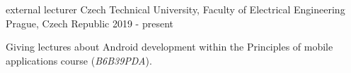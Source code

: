 \begin{cventries}
    \cventry
    {external lecturer}
    {Czech Technical University, Faculty of Electrical Engineering}
    {Prague, Czech Republic}
    {2019 - present}
    {
      \begin{cvitems}
        \item {Giving lectures about Android development within the Principles of mobile applications course (\emph{B6B39PDA}).}
      \end{cvitems}
    }
\end{cventries}
